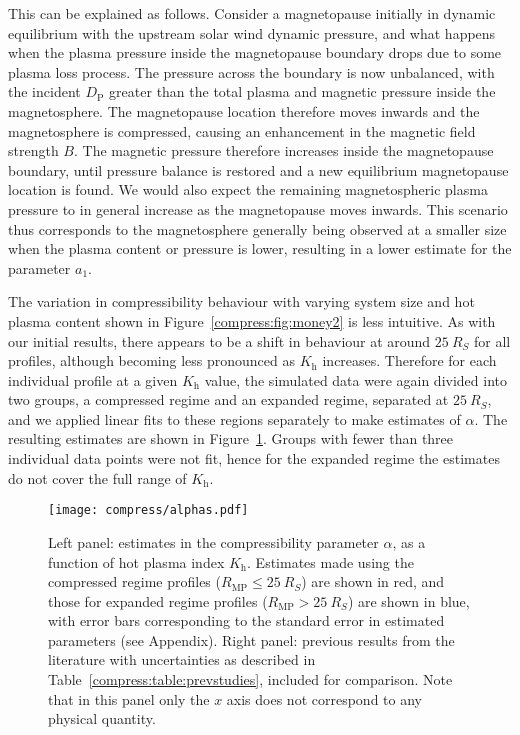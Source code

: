 This can be explained as follows. Consider a magnetopause initially in dynamic equilibrium with the upstream solar wind dynamic pressure, and what happens when the plasma pressure inside the magnetopause boundary drops due to some plasma loss process. The pressure across the boundary is now unbalanced, with the incident $D_\mathrm{P}$ greater than the total plasma and magnetic pressure inside the magnetosphere. The magnetopause location therefore moves inwards and the magnetosphere is compressed, causing an enhancement in the magnetic field strength $B$. The magnetic pressure therefore increases inside the magnetopause boundary, until pressure balance is restored and a new equilibrium magnetopause location is found. We would also expect the remaining magnetospheric plasma pressure to in general increase as the magnetopause moves inwards. This scenario thus corresponds to the magnetosphere generally being observed at a smaller size when the plasma content or pressure is lower, resulting in a lower estimate for the parameter $a_1$.

The variation in compressibility behaviour with varying system size and hot plasma content shown in Figure~\ref{compress:fig:money2} is less intuitive. As with our initial results, there appears to be a shift in behaviour at around $\SI{25}{R_S}$ for all profiles, although becoming less pronounced as $K_\mathrm{h}$ increases. Therefore for each individual profile at a given $K_\mathrm{h}$ value, the simulated data were again divided into two groups, a compressed regime and an expanded regime, separated at $\SI{25}{R_S}$, and we applied linear fits to these regions separately to make estimates of $\alpha$. The resulting estimates are shown in Figure~\ref{compress:fig:alphas}. Groups with fewer than three individual data points were not fit, hence for the expanded regime the estimates do not cover the full range of $K_\mathrm{h}$.
\begin{figure}
\centering
\noindent\texttt{[image: compress/alphas.pdf]}
\caption[Estimates of magnetospheric compressibility parameter $\alpha$, for different system sizes and $K_\mathrm{H}$ values.]{Left panel: estimates in the compressibility parameter $\alpha$, as a function of hot plasma index $K_\mathrm{h}$. Estimates made using the compressed regime profiles ($R_\mathrm{MP} \leq \SI{25}{R_S}$) are shown in red, and those for expanded regime profiles ($R_\mathrm{MP} > \SI{25}{R_S}$) are shown in blue, with error bars corresponding to the standard error in estimated parameters (see Appendix). Right panel: previous results from the literature with uncertainties as described in Table~\ref{compress:table:prevstudies}, included for comparison. Note that in this panel only the $x$ axis does not correspond to any physical quantity.}
\label{compress:fig:alphas}
\end{figure}

